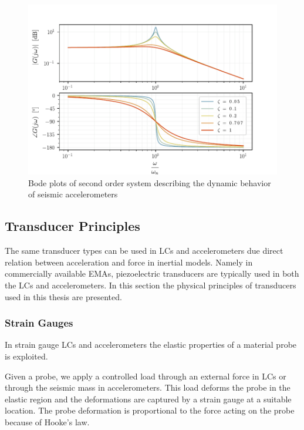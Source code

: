 \begin{figure}[!htb]
  \centering
  \includegraphics[scale=0.8]{figures/measurement/accel/seismic_accelerometer_edited}
  \caption[Second-Order System Bode Plots]{Bode plots of second order system describing the dynamic behavior of seismic accelerometers%
    \label{fig:seismic_accelerometer_edited}}
\end{figure}

\subsection{Transducer Principles}

The same transducer types can be used in \ac{LC}s and accelerometers due direct relation between acceleration and force in inertial models. Namely in commercially available \ac{EMA}s, piezoelectric transducers are typically used in both the \ac{LC}s and accelerometers. In this section the physical principles of transducers used in this thesis are presented.

\subsubsection{Strain Gauges}

In strain gauge \ac{LC}s and accelerometers the elastic properties of a material probe is exploited.

Given a probe, we apply a controlled load through an external force in \ac{LC}s or through the seismic mass in accelerometers. This load deforms the probe in the elastic region and the deformations are captured by a strain gauge at a suitable location. The probe deformation is proportional to the force acting on the probe because of Hooke's law.

